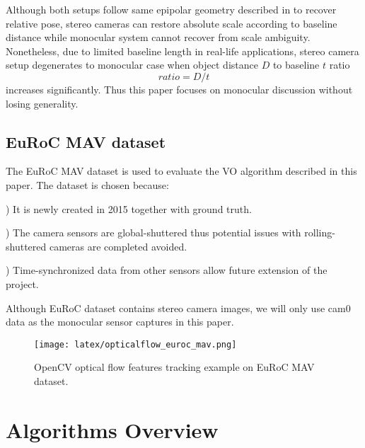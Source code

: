 \documentclass[10pt,twocolumn,letterpaper]{article}
\begin{document}
Although both setups follow same epipolar geometry described in \cite{Hartley2004} to recover relative pose, stereo cameras can restore absolute scale according to baseline distance while monocular system cannot recover from scale ambiguity. Nonetheless, due to limited baseline length in real-life applications, stereo camera setup degenerates to monocular case when object distance $D$ to baseline $t$ ratio 
\begin{equation} \label{eq:1}
ratio=D/t
\end{equation}
increases significantly. Thus this paper focuses on monocular discussion without losing generality. 




\subsection{EuRoC MAV dataset}

The EuRoC MAV dataset \cite{Burri25012016} is used to evaluate the VO algorithm described in this paper. The dataset is chosen because:

) It is newly created in 2015 together with ground truth.

) The camera sensors are global-shuttered thus potential issues with rolling-shuttered cameras are completed avoided. 

) Time-synchronized data from other sensors allow future extension of the project.  

Although EuRoC dataset contains stereo camera images, we will only use cam0 data as the monocular sensor captures in this paper.  


\begin{figure}[h]
\texttt{[image: latex/opticalflow\_euroc\_mav.png]}
\caption{OpenCV optical flow features tracking example on EuRoC MAV dataset.}
\label{fig:figure2}
\end{figure}

\section{Algorithms Overview}
\end{document}

